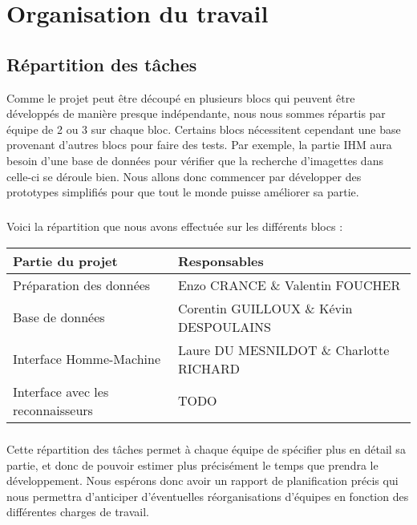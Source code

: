 \chapter{Organisation du travail}

\section{Répartition des tâches}

Comme le projet peut être découpé en plusieurs blocs qui peuvent être
développés de manière presque indépendante, nous nous sommes répartis
par équipe de 2 ou 3 sur chaque bloc. Certains blocs nécessitent
cependant une base provenant d’autres blocs pour faire des tests.
Par exemple, la partie IHM aura besoin d’une base de données pour
vérifier que la recherche d’imagettes dans celle-ci se déroule bien.
Nous allons donc commencer par développer des prototypes simplifiés
pour que tout le monde puisse améliorer sa partie.

\paragraph{}
Voici la répartition que nous avons effectuée sur les différents blocs :

\begin{center}
\begin{tabular}{ | l | l | }
\hline
{\textbf{Partie du projet}}             &   {\textbf{Responsables}} \\ \hline
{Préparation des données}               &   {Enzo CRANCE \& Valentin FOUCHER} \\ \hline
{Base de données}                       &   {Corentin GUILLOUX \& Kévin DESPOULAINS} \\ \hline
{Interface Homme-Machine}               &   {Laure DU MESNILDOT \& Charlotte RICHARD} \\ \hline
{Interface avec les reconnaisseurs}     &   {TODO} \\ \hline
\end{tabular}
\end{center}

\paragraph{}
Cette répartition des tâches permet à chaque équipe de spécifier plus en détail
sa partie, et donc de pouvoir estimer plus précisément le temps que prendra le
développement. Nous espérons donc avoir un rapport de planification précis qui
nous permettra d’anticiper d’éventuelles réorganisations d’équipes en fonction
des différentes charges de travail.

